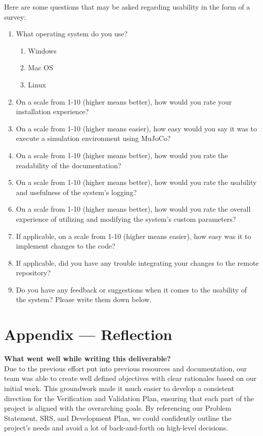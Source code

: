 \documentclass[12pt, titlepage]{article}
\begin{document}
Here are some questions that may be asked regarding usability in the form of a survey:
\begin{enumerate}
  \item What operating system do you use?
  \begin{enumerate}
    \item Windows
    \item Mac OS
    \item Linux
  \end{enumerate}
  \item On a scale from 1-10 (higher means better), how would you rate your installation experience?
  \item On a scale from 1-10 (higher means easier), how easy would you say it was to execute a simulation environment using MuJoCo?
  \item On a scale from 1-10 (higher means better), how would you rate the readability of the documentation?
  \item On a scale from 1-10 (higher means better), how would you rate the usability and usefulness of the system's logging?
  \item On a scale from 1-10 (higher means better), how would you rate the overall experience of utilizing and modifying the system's custom parameters?
  \item If applicable, on a scale from 1-10 (higher means easier), how easy was it to implement changes to the code?
  \item If applicable, did you have any trouble integrating your changes to the remote repository?
  \item Do you have any feedback or suggestions when it comes to the usability of the system? Please write them down below.
\end{enumerate}

\newpage{}
\section*{Appendix --- Reflection}



% 

\textbf{What went well while writing this deliverable?} 
\\
  
Due to the previous effort put into previous resources and documentation, our team was able to create well defined objectives with clear rationales based on our initial work. This groundwork made it much easier to develop a consistent direction for the Verification and Validation Plan, ensuring that each part of the project is aligned with the overarching goals. By referencing our Problem Statement, SRS, and Development Plan, we could confidently outline the project’s needs and avoid a lot of back-and-forth on high-level decisions. 
\end{document}
